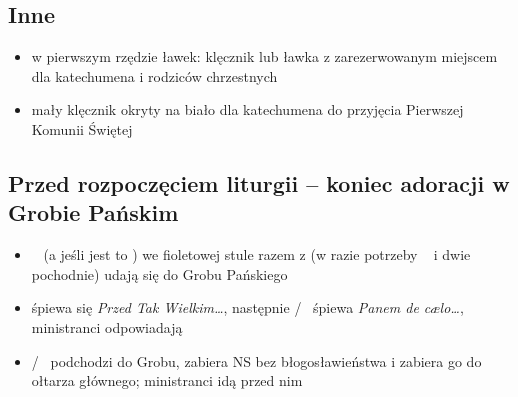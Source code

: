 \subsection{Inne}
\begin{itemize}
	\item w pierwszym rzędzie ławek: klęcznik lub ławka z zarezerwowanym
	      miejscem dla katechumena i rodziców chrzestnych
	\item mały klęcznik okryty na biało dla katechumena do przyjęcia Pierwszej
	      Komunii Świętej
\end{itemize}

\subsection{Przed rozpoczęciem liturgii -- koniec adoracji w Grobie Pańskim}
\begin{itemize}
	\item \ii~ (a jeśli jest to \dd) we {\color{violet} fioletowej} stule razem
	      z  (w razie potrzeby \oo~ i dwie pochodnie) udają się do Grobu
	      Pańskiego
	\item śpiewa się \textit{Przed Tak Wielkim\dots}, następnie \ii/\dd~ śpiewa
	      \textit{Panem de c\ae lo\dots}, ministranci odpowiadają
	\item \ii/\dd~ podchodzi do Grobu, zabiera NS bez błogosławieństwa i zabiera
	      go do ołtarza głównego; ministranci idą przed nim 
\end{itemize}



